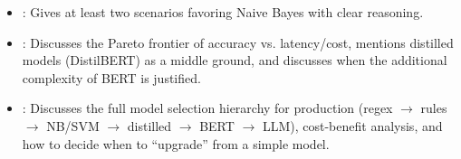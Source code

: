 \begin{interviewq}

\goodgreat
\begin{itemize}
    \item {}: Gives at least two scenarios favoring Naive Bayes with clear
    reasoning.
    \item {}: Discusses the Pareto frontier of accuracy vs. latency/cost,
    mentions distilled models (DistilBERT) as a middle ground, and discusses when the
    additional complexity of BERT is justified.
    \item {}: Discusses the full model selection hierarchy for production
    (regex $\to$ rules $\to$ NB/SVM $\to$ distilled $\to$ BERT $\to$ LLM), cost-benefit
    analysis, and how to decide when to ``upgrade'' from a simple model.
\end{itemize}

\end{interviewq}

\vspace{0.5em}

